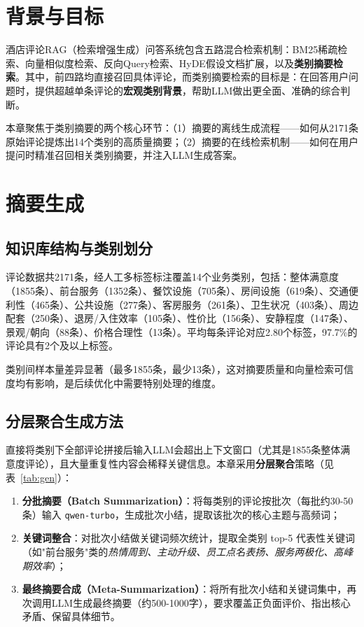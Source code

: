 \documentclass[11pt, a4paper]{article}
\begin{document}
\section{背景与目标}

酒店评论RAG（检索增强生成）问答系统包含五路混合检索机制：BM25稀疏检索、向量相似度检索、反向Query检索、HyDE假设文档扩展，以及\textbf{类别摘要检索}。其中，前四路均直接召回具体评论，而类别摘要检索的目标是：在回答用户问题时，提供超越单条评论的\textbf{宏观类别背景}，帮助LLM做出更全面、准确的综合判断。

本章聚焦于类别摘要的两个核心环节：（1）摘要的离线生成流程——如何从2171条原始评论提炼出14个类别的高质量摘要；（2）摘要的在线检索机制——如何在用户提问时精准召回相关类别摘要，并注入LLM生成答案。

\section{摘要生成}

\subsection{知识库结构与类别划分}

评论数据共2171条，经人工多标签标注覆盖14个业务类别，包括：整体满意度（1855条）、前台服务（1352条）、餐饮设施（705条）、房间设施（619条）、交通便利性（465条）、公共设施（277条）、客房服务（261条）、卫生状况（403条）、周边配套（250条）、退房/入住效率（105条）、性价比（156条）、安静程度（147条）、景观/朝向（88条）、价格合理性（13条）。平均每条评论对应2.80个标签，97.7\%的评论具有2个及以上标签。

类别间样本量差异显著（最多1855条，最少13条），这对摘要质量和向量检索可信度均有影响，是后续优化中需要特别处理的维度。

\subsection{分层聚合生成方法}

直接将类别下全部评论拼接后输入LLM会超出上下文窗口（尤其是1855条整体满意度评论），且大量重复性内容会稀释关键信息。本章采用\textbf{分层聚合}策略（见表~\ref{tab:gen}）：

\begin{enumerate}[leftmargin=2em]
  \item \textbf{分批摘要（Batch Summarization）}：将每类别的评论按批次（每批约30-50条）输入 \texttt{qwen-turbo}，生成批次小结，提取该批次的核心主题与高频词；
  \item \textbf{关键词整合}：对批次小结做关键词频次统计，提取全类别 top-5 代表性关键词（如"前台服务"类的\textit{热情周到、主动升级、员工点名表扬、服务两极化、高峰期效率}）；
  \item \textbf{最终摘要合成（Meta-Summarization）}：将所有批次小结和关键词集中，再次调用LLM生成最终摘要（约500-1000字），要求覆盖正负面评价、指出核心矛盾、保留具体细节。
\end{enumerate}
\end{document}
